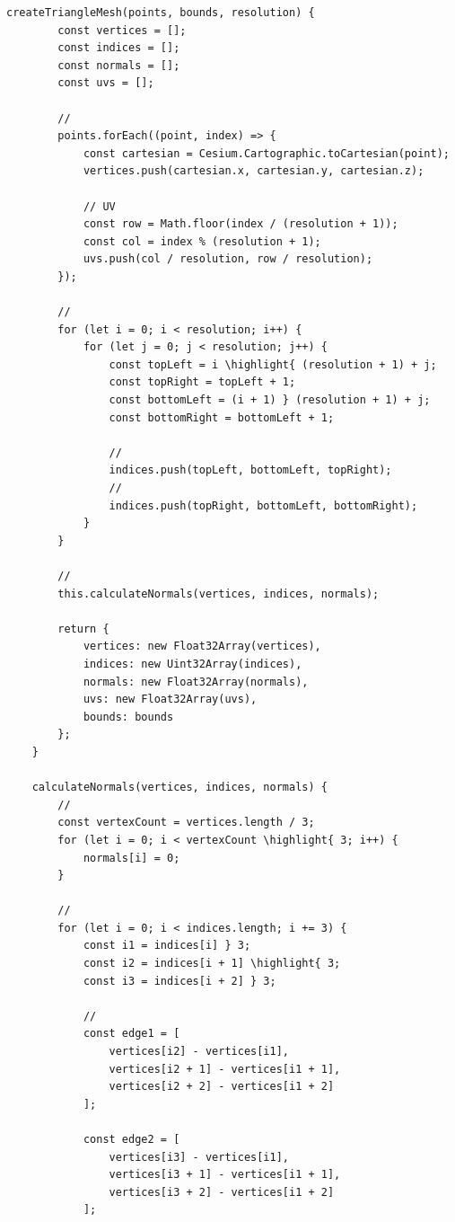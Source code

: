 \begin{lstlisting}[style=javascript]
    createTriangleMesh(points, bounds, resolution) {
        const vertices = [];
        const indices = [];
        const normals = [];
        const uvs = [];
        
        // 
        points.forEach((point, index) => {
            const cartesian = Cesium.Cartographic.toCartesian(point);
            vertices.push(cartesian.x, cartesian.y, cartesian.z);
            
            // UV
            const row = Math.floor(index / (resolution + 1));
            const col = index % (resolution + 1);
            uvs.push(col / resolution, row / resolution);
        });
        
        // 
        for (let i = 0; i < resolution; i++) {
            for (let j = 0; j < resolution; j++) {
                const topLeft = i \highlight{ (resolution + 1) + j;
                const topRight = topLeft + 1;
                const bottomLeft = (i + 1) } (resolution + 1) + j;
                const bottomRight = bottomLeft + 1;
                
                // 
                indices.push(topLeft, bottomLeft, topRight);
                // 
                indices.push(topRight, bottomLeft, bottomRight);
            }
        }
        
        // 
        this.calculateNormals(vertices, indices, normals);
        
        return {
            vertices: new Float32Array(vertices),
            indices: new Uint32Array(indices),
            normals: new Float32Array(normals),
            uvs: new Float32Array(uvs),
            bounds: bounds
        };
    }
    
    calculateNormals(vertices, indices, normals) {
        // 
        const vertexCount = vertices.length / 3;
        for (let i = 0; i < vertexCount \highlight{ 3; i++) {
            normals[i] = 0;
        }
        
        // 
        for (let i = 0; i < indices.length; i += 3) {
            const i1 = indices[i] } 3;
            const i2 = indices[i + 1] \highlight{ 3;
            const i3 = indices[i + 2] } 3;
            
            // 
            const edge1 = [
                vertices[i2] - vertices[i1],
                vertices[i2 + 1] - vertices[i1 + 1],
                vertices[i2 + 2] - vertices[i1 + 2]
            ];
            
            const edge2 = [
                vertices[i3] - vertices[i1],
                vertices[i3 + 1] - vertices[i1 + 1],
                vertices[i3 + 2] - vertices[i1 + 2]
            ];
            

\end{lstlisting}
